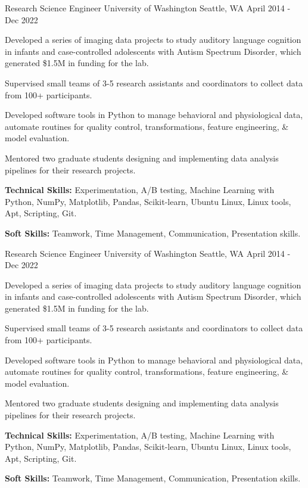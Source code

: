 \begin{cventries}
  \cventry
  {Research Science Engineer} %
  {University of Washington} %
  {Seattle, WA} %
  {April 2014 - Dec 2022} %
  {
    \begin{cvitems} %
      \item {Developed a series of imaging data projects to study auditory language cognition in infants and case-controlled adolescents with Autism Spectrum Disorder, which generated \$1.5M in funding for the lab.}
      \item {Supervised small teams of 3-5 research assistants and coordinators to collect data from 100+ participants.} %
      \item {Developed software tools in Python to manage behavioral and physiological data, automate routines for quality control, transformations, feature engineering, \& model evaluation.}
      \item {Mentored two graduate students designing and implementing data analysis pipelines for their research projects.}
      \item {\textbf{Technical Skills:} Experimentation, A/B testing, Machine Learning with Python, NumPy, Matplotlib, Pandas, Scikit-learn, Ubuntu Linux, Linux tools, Apt, Scripting, Git.}
      \item {\textbf{Soft Skills:} Teamwork, Time Management, Communication, Presentation skills.}
    \end{cvitems}
  }

  \cventry
  {Research Science Engineer} %
  {University of Washington} %
  {Seattle, WA} %
  {April 2014 - Dec 2022} %
  {
    \begin{cvitems} %
      \item {Developed a series of imaging data projects to study auditory language cognition in infants and case-controlled adolescents with Autism Spectrum Disorder, which generated \$1.5M in funding for the lab.}
      \item {Supervised small teams of 3-5 research assistants and coordinators to collect data from 100+ participants.} %
      \item {Developed software tools in Python to manage behavioral and physiological data, automate routines for quality control, transformations, feature engineering, \& model evaluation.}
      \item {Mentored two graduate students designing and implementing data analysis pipelines for their research projects.}
      \item {\textbf{Technical Skills:} Experimentation, A/B testing, Machine Learning with Python, NumPy, Matplotlib, Pandas, Scikit-learn, Ubuntu Linux, Linux tools, Apt, Scripting, Git.}
      \item {\textbf{Soft Skills:} Teamwork, Time Management, Communication, Presentation skills.}
    \end{cvitems}
  }


\end{cventries}
